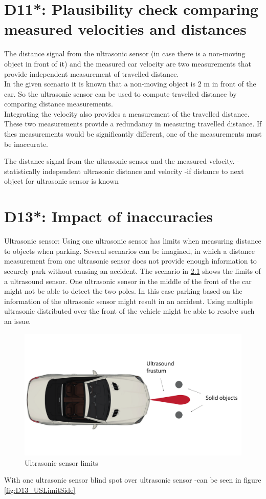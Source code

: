 \chapter{D11*: Plausibility check comparing measured velocities and distances}\label{cha:D11}
The distance signal from the ultrasonic sensor (in case there is a non-moving object in front of it) and the measured car velocity are two measurements that provide independent measurement of travelled distance.\\
In the given scenario it is known that a non-moving object is 2 m in front of the car. So the ultrasonic sensor can be used to compute travelled distance by comparing distance measurements.\\
Integrating the velocity also provides a measurement of the travelled distance. These two measurements provide a redundancy in measuring travelled distance. If thes measurements would be significantly different, one of the measurements must be inaccurate. 

The distance signal from the ultrasonic sensor and the measured velocity.
-statistically independent ultrasonic distance and velocity
-if distance to next object for ultrasonic sensor is known

\chapter{D13*: Impact of inaccuracies}\label{cha:D13}
Ultrasonic sensor:
Using one ultrasonic sensor has limits when measuring distance to objects when parking.
Several scenarios can be imagined, in which a distance measurement from one ultrasonic sensor does not provide enough information to securely park without causing an accident.
The scenario in \ref{fig:D13_USLimitAbove} shows the limits of a ultrasound sensor. One ultrasonic sensor in the middle of the front of the car might not be able to detect the two poles. In this case parking based on the information of the ultrasonic sensor might result in an accident.
Using multiple ultrasonic distributed over the front of the vehicle might be able to resolve such an issue.
\begin{figure}[H]
\centering
\includegraphics[width=.7\textwidth]{images/us_drawing.pdf}
\caption{Ultrasonic sensor limits}
\label{fig:D13_USLimitAbove}
\end{figure}
With one ultrasonic sensor blind spot over ultrasonic sensor
-can be seen in figure \ref{fig:D13_USLimitSide}

